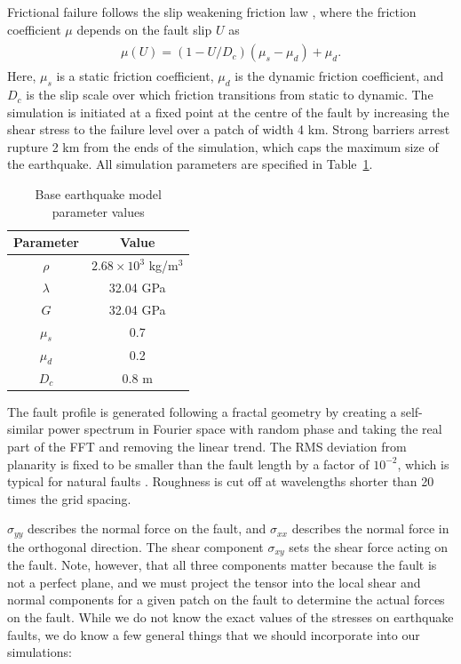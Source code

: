 \documentclass[openacc]{rstransa}%
\begin{document}
Frictional failure follows the slip weakening friction law \cite{slipweak}, where the friction coefficient $\mu$ depends
on the fault slip $U$ as
\begin{align}\label{slipweak}
\begin{split}
\mu(U) = (1 - U/D_c)(\mu_s-\mu_d) + \mu_d.
\end{split}
\end{align}
Here, $\mu_s$ is a static friction coefficient, $\mu_d$ is the dynamic friction coefficient, and $D_c$
is the slip scale over which friction transitions from static to dynamic. The simulation is initiated
at a fixed point at the centre of the fault by increasing the shear stress to the failure level over
a patch of width 4 km. Strong barriers arrest rupture 2 km from the ends of the simulation, which
caps the maximum size of the earthquake. All simulation parameters
are specified in Table~\ref{table_eq}.

\begin{table}[!h]
\caption{Base earthquake model parameter values}
\label{table_eq}
\begin{tabular}{cc}%
\hline
Parameter & Value \\
\hline
$\rho$ & $2.68 \times 10^3$ kg/m$^3$ \\
$\lambda$ & 32.04 GPa \\
$G$ & 32.04 GPa \\
$\mu_s$ & 0.7 \\
$\mu_d$ & 0.2 \\
$D_c$ & 0.8 m \\
\hline
\end{tabular}
\vspace*{-4pt}
\end{table}%

The fault profile is generated following a fractal geometry by creating a self-similar power spectrum in
Fourier space with random phase and taking the real part of the FFT and removing the linear trend.
The RMS deviation from planarity is fixed to be smaller than the fault length by a factor of $10^{-2}$,
which is typical
for natural faults \cite{dunhametal}. Roughness is cut off at wavelengths shorter than 20 times the
grid spacing.

$\sigma_{yy}$ describes the normal force on the fault, and $\sigma_{xx}$ describes the normal force in the orthogonal direction. The shear component $\sigma_{xy}$ sets the shear force acting on the fault. Note, however, that all three components matter because the fault is not a perfect plane, and we must project the tensor into the local shear and normal components for a given patch on the fault to determine the actual forces on the fault.
While we do not know the exact values of the stresses on earthquake faults, we do know a few general things that we should incorporate into our simulations:
\end{document}
